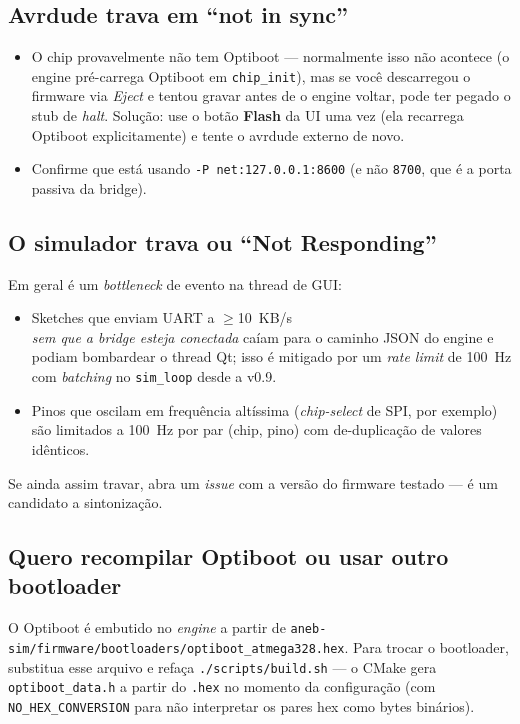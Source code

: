 \documentclass[12pt,a4paper]{article}
\begin{document}
\subsection{Avrdude trava em ``not in sync''}

\begin{itemize}[nosep]
  \item O chip provavelmente não tem Optiboot --- normalmente isso
        não acontece (o engine pré-carrega Optiboot em
        \texttt{chip\_init}), mas se você descarregou o firmware via
        \emph{Eject} e tentou gravar antes de o engine voltar, pode
        ter pegado o stub de \emph{halt}. Solução: use o botão
        \textbf{Flash} da UI uma vez (ela recarrega Optiboot
        explicitamente) e tente o avrdude externo de novo.
  \item Confirme que está usando \texttt{-P net:127.0.0.1:8600} (e
        não \texttt{8700}, que é a porta passiva da bridge).
\end{itemize}

\subsection{O simulador trava ou ``Not Responding''}

Em geral é um \emph{bottleneck} de evento na thread de GUI:

\begin{itemize}[nosep]
  \item Sketches que enviam UART a $\geq$10~KB/s\\ \emph{sem que a
        bridge esteja conectada} caíam para o caminho JSON do engine
        e podiam bombardear o thread Qt; isso é mitigado por um
        \emph{rate limit} de 100~Hz com \emph{batching} no
        \texttt{sim\_loop} desde a v0.9.
  \item Pinos que oscilam em frequência altíssima (\emph{chip-select}
        de SPI, por exemplo) são limitados a 100~Hz por par
        (chip, pino) com de-duplicação de valores idênticos.
\end{itemize}

Se ainda assim travar, abra um \emph{issue} com a versão do firmware
testado --- é um candidato a sintonização.

\subsection{Quero recompilar Optiboot ou usar outro bootloader}

O Optiboot é embutido no \emph{engine} a partir de
\texttt{aneb-sim/firmware/bootloaders/optiboot\_atmega328.hex}. Para
trocar o bootloader, substitua esse arquivo e refaça
\texttt{./scripts/build.sh} --- o CMake gera
\texttt{optiboot\_data.h} a partir do \texttt{.hex} no momento da
configuração (com \texttt{NO\_HEX\_CONVERSION} para não interpretar
os pares hex como bytes binários).
\end{document}
